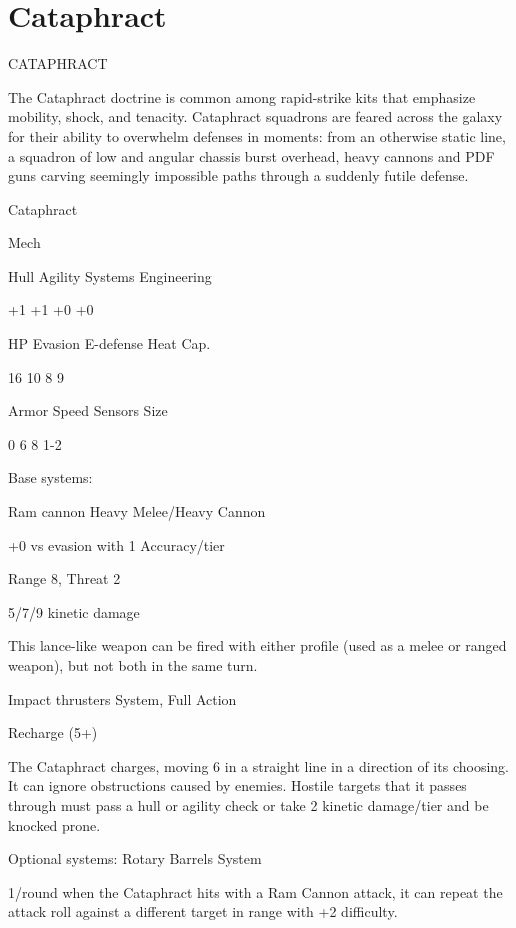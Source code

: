\section{Cataphract}
                                            CATAPHRACT  

The Cataphract doctrine is common among rapid-strike kits that emphasize mobility, shock, and  
tenacity. Cataphract squadrons are feared across the galaxy for their ability to overwhelm  
defenses in moments: from an otherwise static line, a squadron of low and angular chassis burst  
overhead, heavy cannons and PDF guns carving seemingly impossible paths through a suddenly  
futile defense. 
 

 Cataphract 

 Mech 

 Hull       Agility      Systems       Engineering 

 +1         +1           +0            +0 

 HP         Evasion      E-defense     Heat Cap. 

 16         10           8             9 

 Armor      Speed        Sensors       Size 

 0          6            8             1-2 

Base systems:
 
Ram cannon  
Heavy Melee/Heavy Cannon
 
+0 vs evasion with 1 Accuracy/tier
 
Range 8, Threat 2
 
5/7/9 kinetic damage
 
This lance-like weapon can be fired with either profile (used as a melee or ranged weapon), but  
not both in the same turn.
 

Impact thrusters  
System, Full Action
 
Recharge (5+)
 
The Cataphract charges, moving 6 in a straight line in a direction of its choosing. It can ignore  
obstructions caused by enemies. Hostile targets that it passes through must pass a hull or agility  
check or take 2 kinetic damage/tier and be knocked prone.
 

Optional systems:  
Rotary Barrels  
System
 
1/round when the Cataphract hits with a Ram Cannon attack, it can repeat the attack roll against  
a different target in range with +2 difficulty.
 

